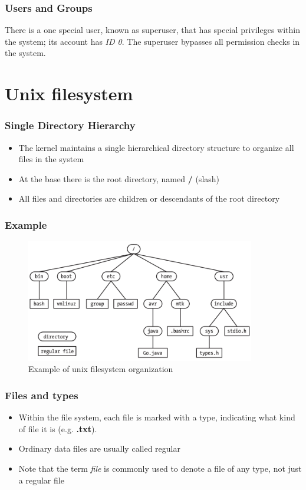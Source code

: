 \documentclass{beamer}
\begin{document}
\begin{frame}
\frametitle{Users and Groups}
\begin{definition}
There is a one special user, known as \alert{superuser}, that has special privileges within the system; its account has \emph{ID 0}. The superuser bypasses all permission checks in the system.
\end{definition}
\end{frame}

\section{Unix filesystem}
\begin{frame}
\frametitle{Single Directory Hierarchy}
\begin{itemize}
\item The kernel maintains a single hierarchical directory structure to organize all files in the system
\item At the base there is the root directory, named \textbf{/} (slash)
\item All files and directories are children or descendants of the root directory
\end{itemize}
\end{frame}

\begin{frame}
\frametitle{Example}
\begin{figure}[h]
\centering
\includegraphics[width=10cm]{images/unix_filesystem.png}
\caption{Example of unix filesystem organization}
\end{figure}
\end{frame}

\begin{frame}
\frametitle{Files and types}
\begin{itemize}
\item Within the file system, each file is marked with a \alert{type}, indicating what kind of file it is (e.g. \textbf{.txt}).
\item Ordinary data files are usually called \alert{regular}
\item Note that the term \emph{file} is commonly used to denote a file of any type, not just a regular file
\end{itemize}
\end{frame}
\end{document}
